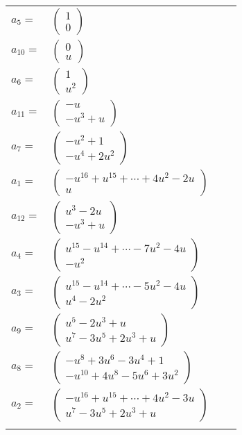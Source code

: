 \documentclass[1p]{elsarticle_modified}
\theoremstyle{definition}
\begin{document}
\begin{tabular}{m{7pt} m{180pt} m{7pt} m{180pt} }
\flushright $a_{5}=$&$\begin{pmatrix}1\\0\end{pmatrix}$ \\
\flushright $a_{10}=$&$\begin{pmatrix}0\\u\end{pmatrix}$ \\
\flushright $a_{6}=$&$\begin{pmatrix}1\\u^2\end{pmatrix}$ \\
\flushright $a_{11}=$&$\begin{pmatrix}- u\\- u^3+u\end{pmatrix}$ \\
\flushright $a_{7}=$&$\begin{pmatrix}- u^2+1\\- u^4+2 u^2\end{pmatrix}$ \\
\flushright $a_{1}=$&$\begin{pmatrix}- u^{16}+u^{15}+\cdots+4 u^2-2 u\\u\end{pmatrix}$ \\
\flushright $a_{12}=$&$\begin{pmatrix}u^3-2 u\\- u^3+u\end{pmatrix}$ \\
\flushright $a_{4}=$&$\begin{pmatrix}u^{15}- u^{14}+\cdots-7 u^2-4 u\\- u^2\end{pmatrix}$ \\
\flushright $a_{3}=$&$\begin{pmatrix}u^{15}- u^{14}+\cdots-5 u^2-4 u\\u^4-2 u^2\end{pmatrix}$ \\
\flushright $a_{9}=$&$\begin{pmatrix}u^5-2 u^3+u\\u^7-3 u^5+2 u^3+u\end{pmatrix}$ \\
\flushright $a_{8}=$&$\begin{pmatrix}- u^8+3 u^6-3 u^4+1\\- u^{10}+4 u^8-5 u^6+3 u^2\end{pmatrix}$ \\
\flushright $a_{2}=$&$\begin{pmatrix}- u^{16}+u^{15}+\cdots+4 u^2-3 u\\u^7-3 u^5+2 u^3+u\end{pmatrix}$\\&\end{tabular}
\end{document}

